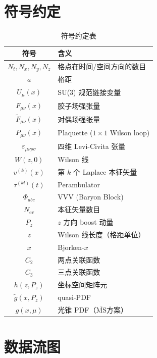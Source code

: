 \documentclass[11pt,a4paper]{ctexart}
\newcommand{\Fmunu}{F_{\mu\nu}}
\newcommand{\Ftmunu}{\tilde{F}_{\mu\nu}}
\newcommand{\eps}{\varepsilon}
\newcommand{\MSbar}{$\overline{\text{MS}}$}
\begin{document}
\section{符号约定}

\begin{table}[htbp]
\centering
\caption{符号约定表}
\begin{tabular}{c l}
\toprule
\textbf{符号} & \textbf{含义} \\
\midrule
$N_t, N_x, N_y, N_z$ & 格点在时间/空间方向的数目 \\
$a$ & 格距 \\
$U_\mu(x)$ & SU(3) 规范链接变量 \\
$\Fmunu(x)$ & 胶子场强张量 \\
$\Ftmunu(x)$ & 对偶场强张量 \\
$P_{\mu\nu}(x)$ & Plaquette ($1\times 1$ Wilson loop) \\
$\eps_{\mu\nu\rho\sigma}$ & 四维 Levi-Civita 张量 \\
$W(z, 0)$ & Wilson 线 \\
$v^{(k)}(x)$ & 第 $k$ 个 Laplace 本征矢量 \\
$\tau^{(kl)}(t)$ & Perambulator \\
$\Phi_{abc}$ & VVV (Baryon Block) \\
$N_{\text{ev}}$ & 本征矢量数目 \\
$P_z$ & $z$ 方向 boost 动量 \\
$z$ & Wilson 线长度（格距单位） \\
$x$ & Bjorken-$x$ \\
$C_2$ & 两点关联函数 \\
$C_3$ & 三点关联函数 \\
$h(z, P_z)$ & 坐标空间矩阵元 \\
$\tilde{g}(x, P_z)$ & quasi-PDF \\
$g(x, \mu)$ & 光锥 PDF（\MSbar{}方案） \\
\bottomrule
\end{tabular}
\end{table}

\section{数据流图}
\end{document}
